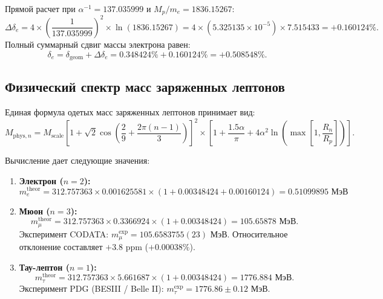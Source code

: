 \documentclass[11pt,a4paper]{article}
\theoremstyle{definition}
\theoremstyle{remark}
\begin{document}
Прямой расчет при $\alpha^{-1} = 137.035999$ и $M_p/m_e = 1836.15267$:
\begin{equation}
    \Delta \delta_e = 4 \times \left( \frac{1}{137.035999} \right)^2 \times \ln(1836.15267) = 4 \times (5.325135 \times 10^{-5}) \times 7.515433 = \mathbf{+0.160124\%}.
\end{equation}
Полный суммарный сдвиг массы электрона равен:
\begin{equation}
    \delta_e = \delta_{\mathrm{geom}} + \Delta \delta_e = 0.348424\% + 0.160124\% = \mathbf{+0.508548\%}.
\end{equation}

\subsection{Физический спектр масс заряженных лептонов}
Единая формула одетых масс заряженных лептонов принимает вид:
\begin{equation}
    M_{\mathrm{phys}, n} = M_{\mathrm{scale}} \left[ 1 + \sqrt{2} \cos\left( \frac{2}{9} + \frac{2\pi(n-1)}{3} \right) \right]^2 \times \left[ 1 + \frac{1.5\alpha}{\pi} + 4\alpha^2 \ln\left( \max\left[ 1, \frac{R_n}{R_p} \right] \right) \right].
    \label{eq:dressed_leptons}
\end{equation}

Вычисление дает следующие значения:
\begin{enumerate}
    \item \textbf{Электрон ($n=2$):}
    \begin{equation}
        m_e^{\mathrm{theor}} = 312.757363 \times 0.001625581 \times (1 + 0.00348424 + 0.00160124) = \mathbf{0.51099895\text{ МэВ}}
    \end{equation}
    
    \item \textbf{Мюон ($n=3$):}
    \begin{equation}
        m_\mu^{\mathrm{theor}} = 312.757363 \times 0.3366924 \times (1 + 0.00348424) = \mathbf{105.65878\text{ МэВ}}.
    \end{equation}
    Эксперимент CODATA: $m_\mu^{\mathrm{exp}} = 105.6583755(23)$ МэВ. Относительное отклонение составляет $+3.8\text{ ppm}$ ($+0.00038\%$).
    
    \item \textbf{Тау-лептон ($n=1$):}
    \begin{equation}
        m_\tau^{\mathrm{theor}} = 312.757363 \times 5.661687 \times (1 + 0.00348424) = \mathbf{1776.884\text{ МэВ}}.
    \end{equation}
    Эксперимент PDG (BESIII / Belle II): $m_\tau^{\mathrm{exp}} = 1776.86 \pm 0.12$ МэВ.
\end{enumerate}
\end{document}
